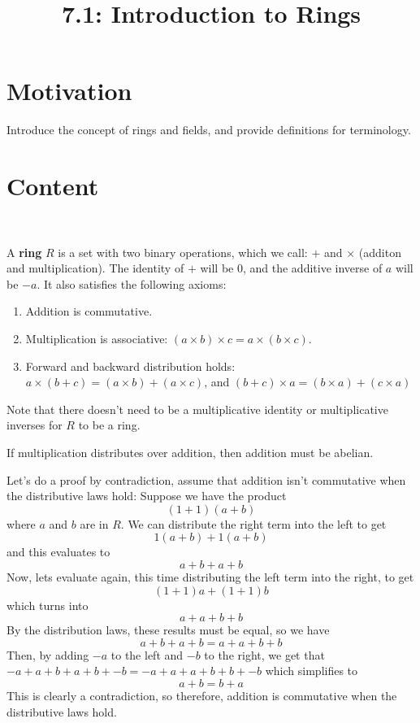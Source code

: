 \documentclass{article}
\title{7.1: Introduction to Rings}
\begin{document}
\maketitle
\section{Motivation}
Introduce the concept of rings and fields, and provide definitions for terminology.

\section{Content}
\ 
\begin{definition}[Rings]
A \textbf{ring} $R$ is a set with two binary operations, which we call: $+$ and $\times$ (additon and multiplication). The identity of $+$ will be $0$, and the additive inverse of $a$ will be $-a$. It also satisfies the following axioms:

\begin{enumerate}
    \item Addition is commutative.
    \item Multiplication is associative: $(a\times b)\times c = a\times(b\times c)$.
    \item Forward and backward distribution holds: $a\times(b+c) = (a\times b) + (a\times c)$, and $(b+c)\times a = (b\times a) + (c\times a)$
\end{enumerate}
\end{definition}

Note that there doesn't need to be a multiplicative identity or multiplicative inverses for $R$ to be a ring.

\begin{proposition}
If multiplication distributes over addition, then addition must be abelian. 
\end{proposition}

\begin{customproof}
Let's do a proof by contradiction, assume that addition isn't commutative when the distributive laws hold: Suppose we have the product $$(1+1)(a+b)$$where $a$ and $b$ are in $R$. We can distribute the right term into the left to get $$1(a+b) + 1(a+b)$$and this evaluates to$$a+b+a+b$$Now, lets evaluate again, this time distributing the left term into the right, to get $$(1+1)a + (1+1)b$$which turns into$$a+a+b+b$$By the distribution laws, these results must be equal, so we have$$a+b+a+b = a+a+b+b$$Then, by adding $-a$ to the left and $-b$ to the right, we get that $-a+a+b+a+b+-b = -a+a+a+b+b+-b$ which simplifies to $$a+b = b+a$$This is clearly a contradiction, so therefore, addition is commutative when the distributive laws hold. 
\end{customproof}
\end{document}
